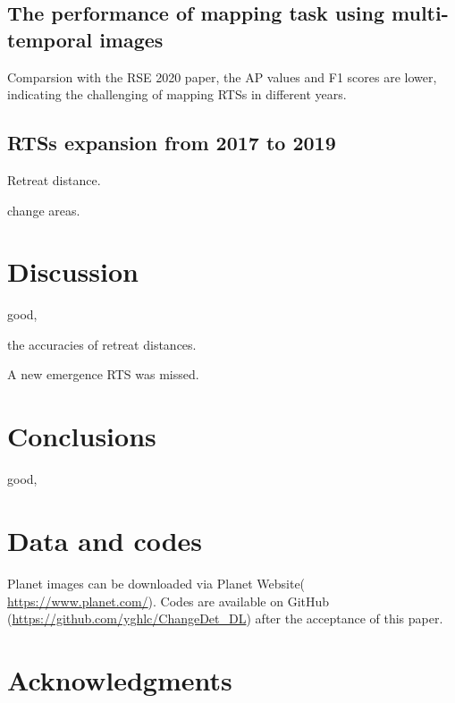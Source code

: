 \documentclass[authoryear,preprint,review,12pt]{elsarticle}
\begin{document}
\subsection{The performance of mapping task using multi-temporal images}
\label{sec_mapping_performance}






Comparsion with the RSE 2020 paper, the AP values and F1 scores are lower, indicating the challenging of mapping RTSs in different years. 


\subsection{RTSs expansion from 2017 to 2019}
\label{sec_rst_expanding}

Retreat distance. 

change areas. 

\section{Discussion}
\label{sec_discussion}

good,

the accuracies of retreat distances. 

A new emergence RTS was missed. 

\section{Conclusions}
\label{sec_conclusion}

 good,

\section{Data and codes}
\label{sec_data_codes}

Planet images can be downloaded via Planet Website( \url{https://www.planet.com/}). 
Codes are available on GitHub (\url{https://github.com/yghlc/ChangeDet_DL}) after the acceptance of this paper.

\section{Acknowledgments}
\label{sec_acknowledgments}
\end{document}
